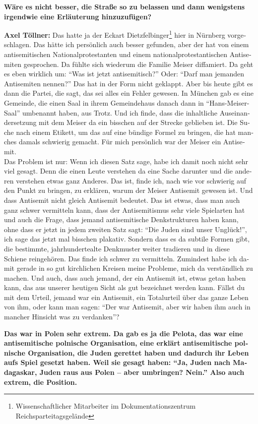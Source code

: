 \begin{otherlanguage}{ngerman}
\textbf{Wäre es nicht besser, die Straße so zu belassen und dann wenigstens irgendwie eine Erläuterung hinzuzufügen?} 

\textbf{Axel Töllner:} Das hatte ja der Eckart Dietzfelbinger\footnote{Wissenschaftlicher Mitarbeiter im Dokumentationszentrum Reichsparteitagsgelände} hier in Nürnberg vorgeschlagen. Das hätte ich persönlich auch besser gefunden, aber der hat von einem antisemitischen Nationalprotestanten und einem nationalprotestantischen Antisemiten gesprochen. Da fühlte sich wiederum die Familie Meiser diffamiert. Da geht es eben wirklich um: "`Was ist jetzt antisemitisch?"' Oder: "`Darf man jemanden Antisemiten nennen?"' Das hat in der Form nicht geklappt. Aber bis heute gibt es dann die Partei, die sagt, das sei alles ein Fehler gewesen. In München gab es eine Gemeinde, die einen Saal in ihrem Gemeindehaus danach dann in "`Hans-Meiser-Saal"' umbenannt haben, aus Trotz. Und ich finde, dass die inhaltliche Auseinandersetzung mit dem Meiser da ein bisschen auf der Strecke geblieben ist. Die Suche nach einem Etikett, um das auf eine bündige Formel zu bringen, die hat manches damals schwierig gemacht. Für mich persönlich war der Meiser ein Antisemit.\\ 
Das Problem ist nur: Wenn ich diesen Satz sage, habe ich damit noch nicht sehr viel gesagt. Denn die einen Leute verstehen da eine Sache darunter und die anderen verstehen etwas ganz Anderes. Das ist, finde ich, nach wie vor schwierig auf den Punkt zu bringen, zu erklären, warum der Meiser Antisemit gewesen ist. Und dass Antisemit nicht gleich Antisemit bedeutet. Das ist etwas, dass man auch ganz schwer vermitteln kann, dass der Antisemitismus sehr viele Spielarten hat und auch die Frage, dass jemand antisemitische Denkstrukturen haben kann, ohne dass er jetzt in jedem zweiten Satz sagt: "`Die Juden sind unser Unglück!"', ich sage das jetzt mal bisschen plakativ. Sondern dass es da subtile Formen gibt, die bestimmte, jahrhundertealte Denkmuster weiter tradieren und in diese Schiene reingehören. Das finde ich schwer zu vermitteln. Zumindest habe ich damit gerade in so gut kirchlichen Kreisen meine Probleme, mich da verständlich zu machen. Und auch, dass auch jemand, der ein Antisemit ist, etwas getan haben kann, das aus unserer heutigen Sicht als gut bezeichnet werden kann. Fällst du mit dem Urteil, jemand war ein Antisemit, ein Totalurteil über das ganze Leben von ihm, oder kann man sagen: "`Der war Antisemit, aber wir haben ihm auch in mancher Hinsicht was zu verdanken"'? 
 
\textbf{Das war in Polen sehr extrem. Da gab es ja die Pelota, das war eine antisemitische polnische Organisation, eine erklärt antisemitische polnische Organisation, die Juden gerettet haben und dadurch ihr Leben aufs Spiel gesetzt haben. Weil sie gesagt haben: "`Ja, Juden nach Madagaskar, Juden raus aus Polen – aber umbringen? Nein."' Also auch extrem, die Position.} 


\end{otherlanguage}

